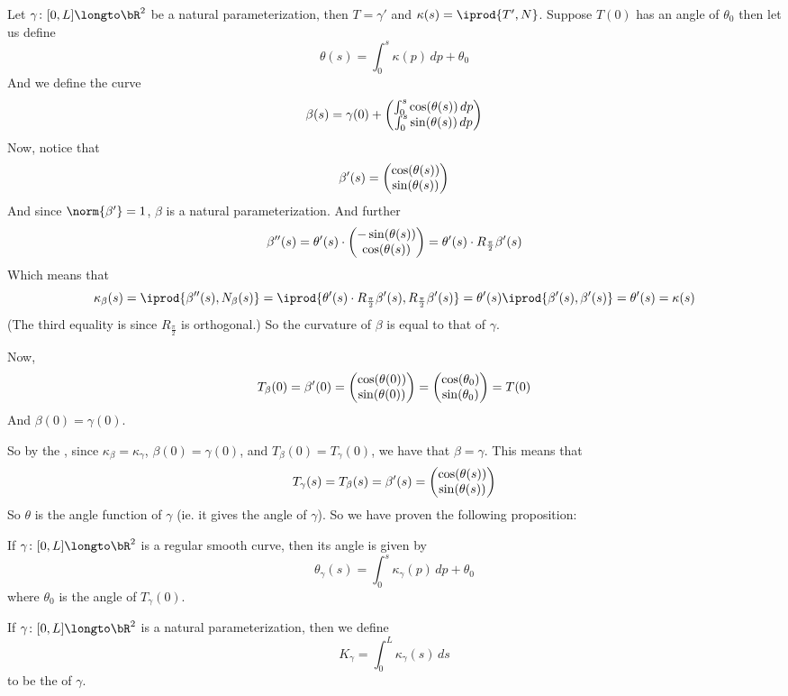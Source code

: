 Let $\gamma\colon[0,L]\longto\bR^2$ be a natural parameterization, then $T=\gamma'$ and $\kappa(s)=\iprod{T',N}$.
Suppose $T(0)$ has an angle of $\theta_0$ then let us define
\[ \theta(s) = \int_0^s \kappa(p)\,dp + \theta_0 \]
And we define the curve
\[ \beta(s) = \gamma(0) + \begin{pmatrix}\int_0^s\cos(\theta(s))\,dp\\\int_0^s\sin(\theta(s))\,dp\end{pmatrix} \]
Now, notice that
\[ \beta'(s) = \begin{pmatrix}\cos(\theta(s))\\\sin(\theta(s))\end{pmatrix} \]
And since $\norm{\beta'}=1$, $\beta$ is a natural parameterization.
And further
\[ \beta''(s) = \theta'(s)\cdot\begin{pmatrix}-\sin(\theta(s))\\\cos(\theta(s))\end{pmatrix} = \theta'(s)\cdot R_{\frac\pi2}\beta'(s) \]
Which means that
\[ \kappa_\beta(s) = \iprod{\beta''(s), N_\beta(s)} = \iprod{\theta'(s)\cdot R_{\frac\pi2}\beta'(s), R_{\frac\pi2}\beta'(s)} = \theta'(s)\iprod{\beta'(s),\beta'(s)}=\theta'(s)=\kappa(s) \]
(The third equality is since $R_{\frac\pi2}$ is orthogonal.)
So the curvature of $\beta$ is equal to that of $\gamma$.

Now,
\[ T_\beta(0) = \beta'(0) = \begin{pmatrix}\cos(\theta(0))\\\sin(\theta(0))\end{pmatrix} = \begin{pmatrix}\cos(\theta_0)\\\sin(\theta_0)\end{pmatrix} = T(0) \]
And $\beta(0)=\gamma(0)$.

So by the , since $\kappa_\beta=\kappa_\gamma$, $\beta(0)=\gamma(0)$, and $T_\beta(0)=T_\gamma(0)$, we have that $\beta=\gamma$.
This means that
\[ T_\gamma(s) = T_\beta(s) = \beta'(s) = \begin{pmatrix}\cos(\theta(s))\\\sin(\theta(s))\end{pmatrix} \]
So $\theta$ is the angle function of $\gamma$ (ie. it gives the angle of $\gamma$).
So we have proven the following proposition:

\begin{prop*}

    If $\gamma\colon[0,L]\longto\bR^2$ is a regular smooth curve, then its angle is given by
    \[ \theta_\gamma(s) = \int_0^s \kappa_\gamma(p)\,dp + \theta_0 \]
    where $\theta_0$ is the angle of $T_\gamma(0)$.

\end{prop*}

\begin{defn*}

    If $\gamma\colon[0,L]\longto\bR^2$ is a natural parameterization, then we define
    \[ K_\gamma = \int_0^L \kappa_\gamma(s)\,ds \]
    to be the  of $\gamma$.

\end{defn*}

